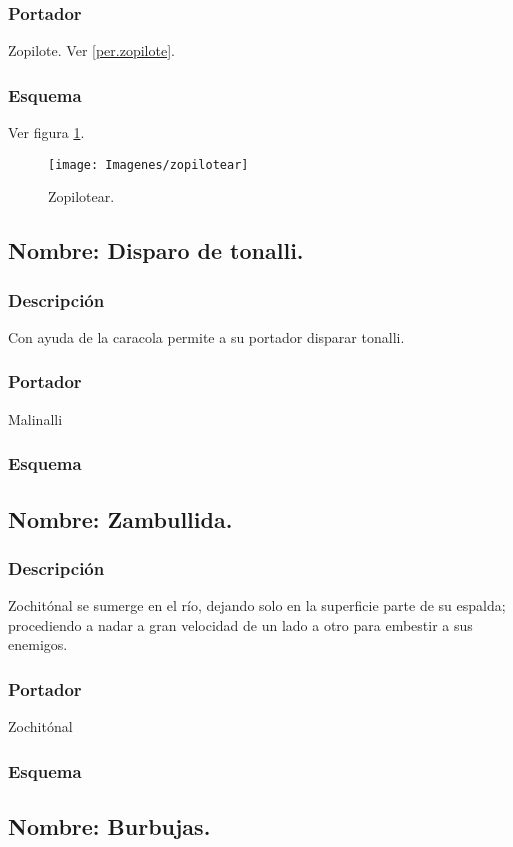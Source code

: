 \documentclass[11pt,letterpaper]{article}
\begin{document}
		\subsubsection{Portador}
		Zopilote. Ver \ref{per.zopilote}.
		\subsubsection{Esquema}
		Ver figura \ref{fig:zopilotear}.
		\begin{figure}
			\centering
			\texttt{[image: Imagenes/zopilotear]}
			\caption{Zopilotear.}
			\label{fig:zopilotear}
		\end{figure}
\subsection{Nombre: Disparo de tonalli.}
\subsubsection{Descripción}
Con ayuda de la caracola permite a su portador disparar tonalli.
\subsubsection{Portador}
Malinalli
\subsubsection{Esquema}
\subsection{Nombre: Zambullida.}
\subsubsection{Descripción}
Zochitónal se sumerge en el río, dejando solo en la superficie parte de su espalda; procediendo a nadar a gran velocidad de un lado a otro para embestir a sus enemigos.  
\subsubsection{Portador}
Zochitónal
\subsubsection{Esquema}
\subsection{Nombre: Burbujas.}
\end{document}
